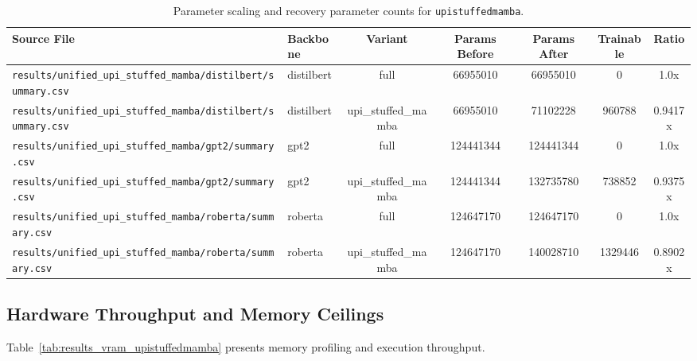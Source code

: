 \begin{table}[t]
\centering
\small
\begin{tabular}{llccccc}
\toprule
\textbf{Source File} & \textbf{Backbone} & \textbf{Variant} & \textbf{Params Before} & \textbf{Params After} & \textbf{Trainable} & \textbf{Ratio} \\
\midrule
\texttt{results/unified\_upi\_stuffed\_mamba/distilbert/summary.csv} & distilbert & full & 66955010 & 66955010 & 0 & 1.0x \\
\texttt{results/unified\_upi\_stuffed\_mamba/distilbert/summary.csv} & distilbert & upi\_stuffed\_mamba & 66955010 & 71102228 & 960788 & 0.9417x \\
\texttt{results/unified\_upi\_stuffed\_mamba/gpt2/summary.csv} & gpt2 & full & 124441344 & 124441344 & 0 & 1.0x \\
\texttt{results/unified\_upi\_stuffed\_mamba/gpt2/summary.csv} & gpt2 & upi\_stuffed\_mamba & 124441344 & 132735780 & 738852 & 0.9375x \\
\texttt{results/unified\_upi\_stuffed\_mamba/roberta/summary.csv} & roberta & full & 124647170 & 124647170 & 0 & 1.0x \\
\texttt{results/unified\_upi\_stuffed\_mamba/roberta/summary.csv} & roberta & upi\_stuffed\_mamba & 124647170 & 140028710 & 1329446 & 0.8902x \\
\bottomrule
\end{tabular}
\caption{Parameter scaling and recovery parameter counts for \texttt{upistuffedmamba}.}
\label{tab:results_params_upistuffedmamba}
\end{table}

\subsection{Hardware Throughput and Memory Ceilings}
Table~\ref{tab:results_vram_upistuffedmamba} presents memory profiling and execution throughput.

